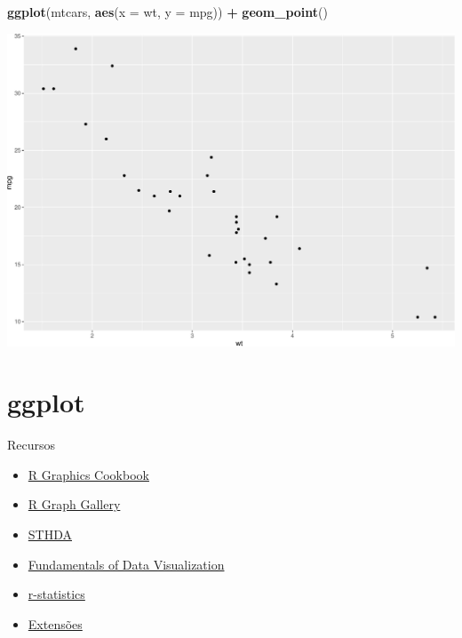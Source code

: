 \documentclass[
  9pt,
  ignorenonframetext,
]{beamer}
\newenvironment{Shaded}{\begin{snugshade}}{\end{snugshade}}
\newcommand{\DataTypeTok}[1]{\textcolor[rgb]{0.13,0.29,0.53}{#1}}
\newcommand{\KeywordTok}[1]{\textcolor[rgb]{0.13,0.29,0.53}{\textbf{#1}}}
\newcommand{\NormalTok}[1]{#1}
\newcommand{\OperatorTok}[1]{\textcolor[rgb]{0.81,0.36,0.00}{\textbf{#1}}}
\newcommand{\StringTok}[1]{\textcolor[rgb]{0.31,0.60,0.02}{#1}}
\begin{document}
\begin{frame}[fragile]{}
\protect\hypertarget{section-3}{}
\begin{Shaded}
\begin{Highlighting}[]
\KeywordTok{ggplot}\NormalTok{(mtcars, }\KeywordTok{aes}\NormalTok{(}\DataTypeTok{x =}\NormalTok{ wt, }\DataTypeTok{y =}\NormalTok{ mpg)) }\OperatorTok{+}
\StringTok{  }\KeywordTok{geom\_point}\NormalTok{()}
\end{Highlighting}
\end{Shaded}

\includegraphics{aula_06_files/figure-beamer/unnamed-chunk-3-1.pdf}
\end{frame}

\hypertarget{ggplot}{%
\section{ggplot}\label{ggplot}}

\begin{frame}{Recursos}
\protect\hypertarget{recursos}{}
\begin{itemize}
\item
  \href{https://r-graphics.org/}{R Graphics Cookbook}
\item
  \href{https://www.r-graph-gallery.com/}{R Graph Gallery}
\item
  \href{http://www.sthda.com/english/wiki/be-awesome-in-ggplot2-a-practical-guide-to-be-highly-effective-r-software-and-data-visualization}{STHDA}
\item
  \href{https://clauswilke.com/dataviz/}{Fundamentals of Data
  Visualization}
\item
  \href{http://r-statistics.co/ggplot2-cheatsheet.html}{r-statistics}
\item
  \href{https://exts.ggplot2.tidyverse.org/gallery/}{Extensões}
\end{itemize}
\end{frame}
\end{document}
